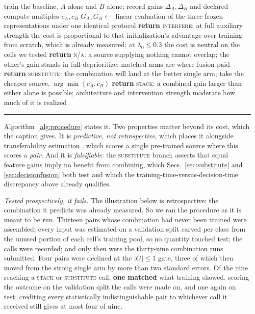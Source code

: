 \begin{table}[pos=htbp]
\begin{minipage}{\columnwidth}
\begin{algorithmic}[1]
\STATE train the baseline, $A$ alone and $B$ alone; record gains
  $\Delta_A, \Delta_B$ and declared compute multiples $c_A, c_B$
\STATE $G_A, G_B \gets$ linear evaluation of the three frozen
  representations under one identical protocol
  \STATE \textbf{return} \textsc{interfere}: at full auxiliary strength the cost is
    proportional to that initialization's advantage over training from
    scratch, which is already measured; at $\lambda_0 \le 0.3$ the cost is
    neutral on the cells we tested
\ENDIF
{}
  \STATE \textbf{return} \textsc{n/a}: a source supplying nothing cannot
    overlap; the other's gain stands in full
\ENDIF
{} \label{alg:asym}
  \STATE deprioritize: matched arms are where fusion paid
\ENDIF
{}
  \STATE \textbf{return} \textsc{substitute}: the combination will land
    at the better single arm; take the cheaper source,
    $\arg\min(c_A, c_B)$
\ELSE
  \STATE \textbf{return} \textsc{stack}: a combined gain larger than either
    alone is possible; architecture and intervention strength moderate how
    much of it is realized \label{alg:stack}
\ENDIF
\end{algorithmic}
\vspace*{-\topsep}\vspace*{4pt}
\rule{\linewidth}{0.8pt}
\end{minipage}
\end{table}

Algorithm~\ref{alg:procedure} states it. Two properties matter beyond its
cost, which the caption gives. It is \emph{predictive, not
retrospective}, which places it alongside transferability estimation
\citep{nguyen2020leep}, which scores a single
pre-trained source where this scores a \emph{pair}. And it is \emph{falsifiable}: the \textsc{substitute} branch
asserts that equal feature gains imply no benefit from combining, which
Secs.~\ref{sec:substitute} and \ref{sec:decisionfusion} both test and which
the training-time-versus-decision-time discrepancy above already qualifies.

\emph{Tested prospectively, it fails.}  The illustration below is
retrospective: the combination it predicts was already measured. So we ran the
procedure as it is meant to be run. Thirteen pairs whose combination had never
been trained were assembled; every input was estimated on a validation split
carved per class from the unused portion of each cell's training pool, so no
quantity touched test; the calls were recorded; and only then were the
thirty-nine combination runs submitted. Four pairs were declined at the
$|G|\le1$ gate, three of which then moved from the strong single arm by more
than two standard errors. Of the nine reaching a \textsc{stack} or
\textsc{substitute} call, \textbf{one matched} what training showed, scoring
the outcome on the validation split the calls were made on, and one again on
test; crediting every statistically indistinguishable pair to whichever call
it received still gives at most four of nine.

